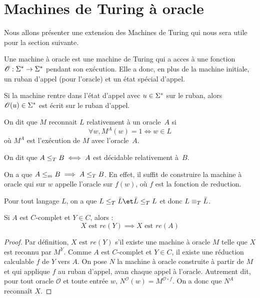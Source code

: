 \section{Machines de Turing à oracle}

Nous allons présenter une extension des Machines de Turing qui nous sera utile pour la section suivante.


\begin{definition}
	Une machine à oracle est une machine de Turing qui a acces à une fonction $\mathscr O : \Sigma^{*} \to \Sigma^{*}$ pendant son exécution. Elle a donc, en plus de la machine
	initiale, un ruban d'appel (pour l'oracle) et un état spécial d'appel.

	Si la machine rentre dans l'état d'appel avec $u \in \Sigma^{*}$ sur le ruban, alors $\mathscr O (u) \in \Sigma^{*}$ est écrit sur le ruban d'appel.
\end{definition}

\begin{definition}[Reconnaissance]
	On dit que $M$ reconnait $L$ relativement à un oracle~$A$ si
	$$ \forall w, M^A (w) = 1 \iff w \in L $$
	où $M^A$ est l'exécution de $M$ avec l'oracle~$A$.
\end{definition}

\begin{definition}
	On dit que $A \leq_T B \iff A$ est décidable relativement à~$B$.
\end{definition}

\begin{remarque}
	On a que $A \leq_m B \implies A \leq_T B$. En effet, il suffit de construire la machine à oracle qui sur $w$ appelle l'oracle sur $f(w)$, où $f$ est la fonction de reduction.
\end{remarque}

\begin{remarque}
	Pour tout langage $L$, on a que $L \leqt \bar L \et \bar L \leqt L$ et donc $L \equiv_T \bar L$.
\end{remarque}


\begin{lemma}
	Si $A$ est $C$-complet et $Y \in C$, alors :
	$$X \text{ est } re(Y) \implies X \text{ est } re(A)$$
\end{lemma}

\begin{proof}
	Par définition, $X \text{ est } re(Y)$ s'il existe une machine à oracle $M$ telle que $X$ est reconnu par $M^Y$.
	Comme $A$ est $C$-complet et $Y \in C$, il existe une réduction calculable $f$ de $Y$ vers $A$.
	On pose $N$ la machine à oracle construite à partir de $M$ et qui applique $f$ au ruban d'appel, avan chaque appel à l'oracle.
	Autrement dit, pour tout oracle ${\mathscr O}$ et toute entrée $w$, $N^{{\mathscr O}}(w) = M^{{\mathscr O} \circ f}$.
	On a donc que $N^A$ reconnaît $X$.
\end{proof}


